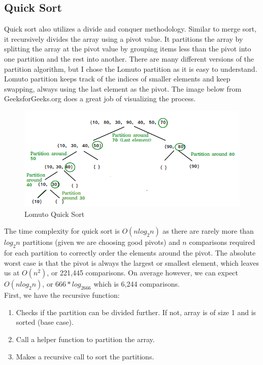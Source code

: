 \documentclass[letterpaper, 10pt]{article}
\begin{document}
\subsection{Quick Sort}
Quick sort also utilizes a divide and conquer methodology. Similar to merge sort, it recursively divides the array using a pivot value. It partitions the array by splitting the array at the pivot value by grouping items less than the pivot into one partition and the rest into another. There are many different versions of the partition algorithm, but I chose the Lomuto partition as it is easy to understand. Lomuto partition keeps track of the indices of smaller elements and keep swapping, always using the last element as the pivot. The image below from GeeksforGeeks.org does a great job of visualizing the process. \\
\begin{figure}[H]
    \centering
    \includegraphics[width=.8\linewidth]{quickSort.png}
    \caption{Lomuto Quick Sort}
    \label{fig:enter-label}
\end{figure}
The time complexity for quick sort is $O(nlog_2n)$ as there are rarely more than \(log_2n \) partitions (given we are choosing good pivots) and $n$ comparisons required for each partition to correctly order the elements around the pivot. The absolute worst case is that the pivot is always the largest or smallest element, which leaves us at $O(n^2)$, or 221,445 comparisons. On average however, we can expect $O(nlog_2n)$, or $666*log_2666$ which is 6,244 comparisons.\\
\newline
First, we have the recursive function: 
\begin{enumerate}
    \item Checks if the partition can be divided further. If not, array is of size 1 and is sorted (base case).
    \item Call a helper function to partition the array.
    \item Makes a recursive call to sort the partitions.
\end{enumerate}
\end{document}
